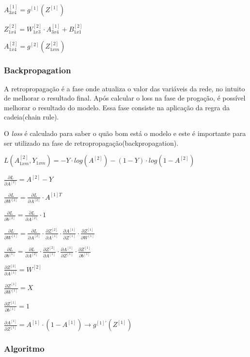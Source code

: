 \documentclass[12pt]{article}
\begin{document}
\(A^{[1]}_{3x4} = g^{[1]}(Z^{[1]})\)

\(Z^{[2]}_{1x4} = W^{[2]}_{1x3} \cdot A^{[1]}_{3x4} + B^{[2]}_{1x1}\)

\(A^{[2]}_{1x4} = g^{[2]}(Z^{[2]}_{1xm})\)

\hypertarget{backpropagation}{%
\subsubsection{Backpropagation}\label{backpropagation}}

A retropropagação é a fase onde atualiza o valor das variáveis da rede,
no intuito de melhorar o resultado final. Após calcular o loss na fase
de progação, é possível melhorar o resultado do modelo. Essa fase
consiste na aplicação da regra da cadeia(chain rule).

O \emph{loss} é calculado para saber o quão bom está o modelo e este é
importante para ser utilizado na fase de
retropropagação(backpropagation).

\(L(A^{[2]}_{1xm}, Y_{1xm}) = -Y \cdot log (A^{[2]}) - (1 - Y) \cdot log (1 - A^{[2]})\)

\(\frac{\partial L}{\partial A^{[2]}} = A^{[2]} - Y\)

\(\frac{\partial L}{\partial W^{[2]}} = \frac{\partial L}{\partial A^{[2]}} \cdot A^{[1]T}\)

\(\frac{\partial L}{\partial b^{[2]}} = \frac{\partial L}{\partial A^{[2]}} \cdot 1\)

\(\frac{\partial L}{\partial W^{[1]}} = \frac{\partial L}{\partial A^{[2]}} \cdot \frac{\partial Z^{[2]}}{\partial A^{[1]}} \cdot \frac{\partial A^{[1]}}{\partial Z^{[1]}} \cdot \frac{\partial Z^{[1]}}{\partial W^{[1]}}\)

\(\frac{\partial L}{\partial b^{[1]}} = \frac{\partial L}{\partial A^{[2]}} \cdot \frac{\partial Z^{[2]}}{\partial A^{[1]}} \cdot \frac{\partial A^{[1]}}{\partial Z^{[1]}} \cdot \frac{\partial Z^{[1]}}{\partial b^{[1]}}\)

\(\frac{\partial Z^{[2]}}{\partial A^{[1]}} = W^{[2]}\)

\(\frac{\partial Z^{[1]}}{\partial W^{[1]}} = X\)

\(\frac{\partial Z^{[1]}}{\partial b^{[1]}} = 1\)

\(\frac{\partial A^{[1]}}{\partial Z^{[1]}} = A^{[1]} \cdot (1 - A^{[1]}) \rightarrow g^{[1]'}(Z^{[1]})\)

\hypertarget{algoritmo}{%
\subsubsection{Algoritmo}\label{algoritmo}}
\end{document}
